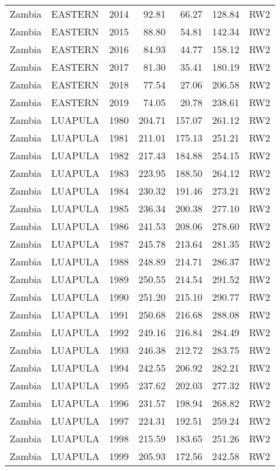 \begin{longtable}{lllrrrl}
  Zambia & EASTERN & 2014 & 92.81 & 66.27 & 128.84 & RW2 \\ 
  Zambia & EASTERN & 2015 & 88.80 & 54.81 & 142.34 & RW2 \\ 
  Zambia & EASTERN & 2016 & 84.93 & 44.77 & 158.12 & RW2 \\ 
  Zambia & EASTERN & 2017 & 81.30 & 35.41 & 180.19 & RW2 \\ 
  Zambia & EASTERN & 2018 & 77.54 & 27.06 & 206.58 & RW2 \\ 
  Zambia & EASTERN & 2019 & 74.05 & 20.78 & 238.61 & RW2 \\ 
  Zambia & LUAPULA & 1980 & 204.71 & 157.07 & 261.12 & RW2 \\ 
  Zambia & LUAPULA & 1981 & 211.01 & 175.13 & 251.21 & RW2 \\ 
  Zambia & LUAPULA & 1982 & 217.43 & 184.88 & 254.15 & RW2 \\ 
  Zambia & LUAPULA & 1983 & 223.95 & 188.50 & 264.12 & RW2 \\ 
  Zambia & LUAPULA & 1984 & 230.32 & 191.46 & 273.21 & RW2 \\ 
  Zambia & LUAPULA & 1985 & 236.34 & 200.38 & 277.10 & RW2 \\ 
  Zambia & LUAPULA & 1986 & 241.53 & 208.06 & 278.60 & RW2 \\ 
  Zambia & LUAPULA & 1987 & 245.78 & 213.64 & 281.35 & RW2 \\ 
  Zambia & LUAPULA & 1988 & 248.89 & 214.71 & 286.37 & RW2 \\ 
  Zambia & LUAPULA & 1989 & 250.55 & 214.54 & 291.52 & RW2 \\ 
  Zambia & LUAPULA & 1990 & 251.20 & 215.10 & 290.77 & RW2 \\ 
  Zambia & LUAPULA & 1991 & 250.68 & 216.68 & 288.08 & RW2 \\ 
  Zambia & LUAPULA & 1992 & 249.16 & 216.84 & 284.49 & RW2 \\ 
  Zambia & LUAPULA & 1993 & 246.38 & 212.72 & 283.75 & RW2 \\ 
  Zambia & LUAPULA & 1994 & 242.55 & 206.92 & 282.21 & RW2 \\ 
  Zambia & LUAPULA & 1995 & 237.62 & 202.03 & 277.32 & RW2 \\ 
  Zambia & LUAPULA & 1996 & 231.57 & 198.94 & 268.82 & RW2 \\ 
  Zambia & LUAPULA & 1997 & 224.31 & 192.51 & 259.24 & RW2 \\ 
  Zambia & LUAPULA & 1998 & 215.59 & 183.65 & 251.26 & RW2 \\ 
  Zambia & LUAPULA & 1999 & 205.93 & 172.56 & 242.58 & RW2 \\ 

\end{longtable}
